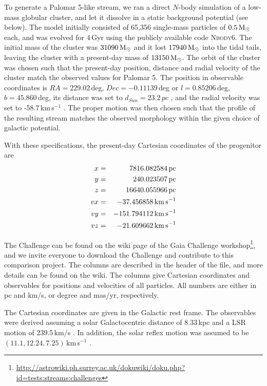 To generate a Palomar 5-like stream, we ran a direct $N$-body simulation of a low-mass globular cluster, and let it dissolve in a static background potential (see below). The model initially consisted of 65,356 single-mass particles of $0.5\mbox{$\,{\rm M}_\odot$}$ each, and was evolved for 4\,Gyr using the publicly available code \textsc{Nbody6}. The initial mass of the cluster was $31090\mbox{$\,{\rm M}_\odot$}$ and it lost $17940\mbox{$\,{\rm M}_\odot$}$ into the tidal tails, leaving the cluster with a present-day mass of $13150\mbox{$\,{\rm M}_\odot$}$. The orbit of the cluster was chosen such that the present-day position, distance and radial velocity of the cluster match the observed values for Palomar 5. The position in observable coordinates is $RA = 229.02$\,deg, $Dec = -0.11139$\,deg or $l = 0.85206$\,deg, $b = 45.860$\,deg, its distance was set to $d_{Sun} = 23.2\,pc$ \citep{Harris96}, and the radial velocity was set to -58.7\,km\,s$^{-1}$ \citep{Odenkirchen02}. The proper motion was then chosen such that the profile of the resulting stream matches the observed morphology within the given choice of galactic potential.

With these specifications, the present-day Cartesian coordinates of the progenitor are 
\begin{eqnarray}
  x &=& 7816.082584\,\mbox{pc}\\
  y &=& 240.023507\,\mbox{pc}\\
  z &=& 16640.055966\,\mbox{pc}\\
  vx &=& -37.456858\,\mbox{km\,s}^{-1}\\
  vy &=& -151.794112\,\mbox{km\,s}^{-1}\\
  vz &=& -21.609662\,\mbox{km\,s}^{-1}
\end{eqnarray}

The Challenge can be found on the wiki page of the Gaia Challenge workshop\footnote{\url{http://astrowiki.ph.surrey.ac.uk/dokuwiki/doku.php?id=tests:streams:challenges}}, and we invite everyone to download the Challenge and contribute to this comparison project. The columns are described in the header of the file, and more details can be found on the wiki. The columns give Cartesian coordinates and observables for positions and velocities of all particles. All numbers are either in pc and km/s, or degree and mas/yr, respectively. 

The Cartesian coordinates are given in the Galactic rest frame. The observables were derived assuming a solar Galactocentric distance of 8.33\,kpc and a LSR motion of 239.5\,km/s \citep{Gillessen09}. In addition, the solar reflex motion was assumed to be $(11.1, 12.24, 7.25)$\,km\,s$^{-1}$ \citep{Schonrich10}.  





